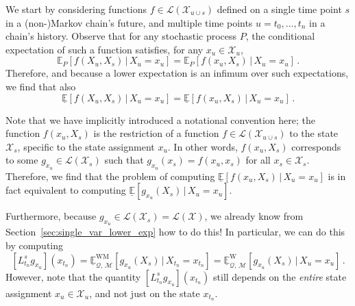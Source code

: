 \documentclass[10pt,a4paper]{paper}
\theoremstyle{definition}
\newcommand{\states}{\mathcal{X}}
\newcommand{\gambles}{\mathcal{L}}
\newcommand{\gamblesX}{\gambles(\states)}
\newcommand{\rateset}{\mathcal{Q}}
\begin{document}
We start by considering functions $f\in\gambles(\states_{u\cup s})$ defined on a single time point $s$ in a (non-)Markov chain's future, and multiple time points $u=t_0,\ldots,t_n$ in a chain's history. Observe that for any stochastic process $P$, the conditional expectation of such a function satisfies, for any $x_u\in\states_u$,
\begin{equation*}
\mathbb{E}_P[f(X_u,X_s)\,\vert\,X_u=x_u] = \mathbb{E}_P[f(x_u,X_s)\,\vert\,X_u=x_u]\,.
\end{equation*}
Therefore, and because a lower expectation is an infimum over such expectations, we find that also
\begin{equation*}
\underline{\mathbb{E}}[f(X_u,X_s)\,\vert\,X_u=x_u] = \underline{\mathbb{E}}[f(x_u,X_s)\,\vert\,X_u=x_u]\,.
\end{equation*}

Note that we have implicitly introduced a notational convention here; the function $f(x_u,X_s)$ is the restriction of a function $f\in\gambles(\states_{u\cup s})$ to the state $\states_s$, specific to the state assignment $x_u$. In other words, $f(x_u,X_s)$ corresponds to some $g_{x_u}\in\gambles(\states_s)$ such that $g_{x_u}(x_s)=f(x_u,x_s)$ for all $x_s\in\states_s$.
Therefore, we find that the problem of computing $\underline{\mathbb{E}}[f(x_u,X_s)\,\vert\,X_u=x_u]$ is in fact equivalent to computing $\underline{\mathbb{E}}[g_{x_u}(X_s)\,\vert\,X_u=x_u]$. 

Furthermore, because $g_{x_u}\in\gambles(\states_{s})=\gamblesX$, we already know from Section~\ref{sec:single_var_lower_exp} how to do this! In particular, we can do this by computing 
\begin{equation*}
\left[L_{t_n}^sg_{x_u}\right](x_{t_n}) = \underline{\mathbb{E}}_{\rateset,\,\mathcal{M}}^{\mathrm{WM}}[g_{x_u}(X_s)\,\vert\,X_{t_n}=x_{t_n}] = \underline{\mathbb{E}}_{\rateset,\,\mathcal{M}}^{\mathrm{W}}[g_{x_u}(X_s)\,\vert\,X_u=x_u]\,.
\end{equation*}
However, note that the quantity $[L_{t_n}^sg_{x_u}](x_{t_n})$ still depends on the \emph{entire} state assignment $x_u\in\states_u$, and not just on the state $x_{t_n}$.
\end{document}
